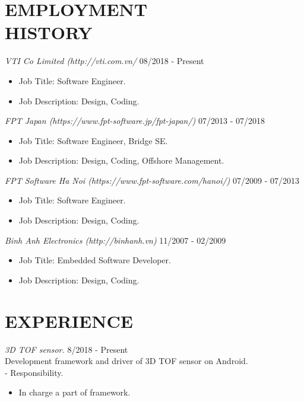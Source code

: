 \documentclass[margin]{res}
\begin{document}
\begin{resume}
 
\section{EMPLOYMENT \\ HISTORY}
		{\sl VTI Co Limited (http://vti.com.vn/}  \hfill 08/2018 - Present
                 \begin{itemize}  \itemsep -2pt  %
                 \item Job Title: Software Engineer.
		 \item Job Description:  Design, Coding. 
                 \end{itemize}

		{\sl FPT Japan (https://www.fpt-software.jp/fpt-japan/)}  \hfill 07/2013 - 07/2018
                 \begin{itemize}  \itemsep -2pt  %
                 \item Job Title: Software Engineer, Bridge SE.
		 \item Job Description:  Design, Coding, Offshore Management. 
                 \end{itemize}

		 {\sl FPT Software Ha Noi (https://www.fpt-software.com/hanoi/)}  \hfill 07/2009 - 07/2013
                 \begin{itemize}  \itemsep -2pt  %
                 \item Job Title: Software Engineer.
		 \item Job Description: Design, Coding.
                 \end{itemize}

		 {\sl Binh Anh Electronics (http://binhanh.vn)}   \hfill 11/2007 - 02/2009
                 \begin{itemize}  \itemsep -2pt  %
		 \item Job Title: Embedded Software Developer. 
		 \item Job Description: Design, Coding.
                 \end{itemize}
        
\section{EXPERIENCE}
                {\sl 3D TOF sensor.} \hfill            8/2018 - Present \\
		 Development framework and driver of 3D TOF sensor on Android.\\
		 - Responsibility.
                 \begin{itemize}  \itemsep -2pt %
                 \item In charge a part of framework.
                 \end{itemize}


\end{resume}
\end{document}
